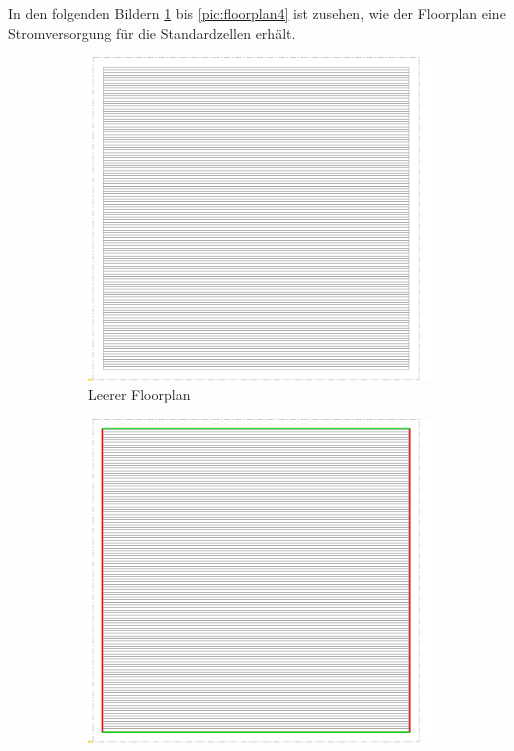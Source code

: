   In den folgenden Bildern \ref{pic:floorplan1} bis \ref{pic:floorplan4} ist zusehen, wie der Floorplan eine Stromversorgung für die Standardzellen erhält. 
    \begin{figure}
        \centering
        \begin{subfigure}[b]{0.475\textwidth}
            \centering
            \includegraphics[width=\textwidth]{img/DFT_FLOORPLAN/CROPPED_IMG/FP_1.png}
            \caption{{\small Leerer Floorplan}}    
            \label{pic:floorplan1}
        \end{subfigure}
        \hfill
        \begin{subfigure}[b]{0.475\textwidth}  
            \centering 
            \includegraphics[width=\textwidth]{img/DFT_FLOORPLAN/CROPPED_IMG/FP_2.png}

\end{subfigure}
\end{figure}
